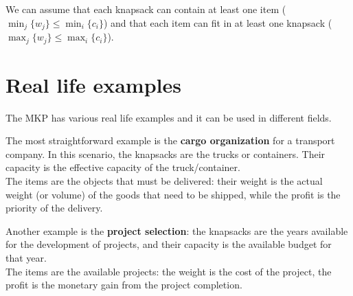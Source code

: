 We can assume that each knapsack can contain at least one item (\(\min_{j}\{w_{j}\} \leq \min_{i}\{c_{i}\}\))
and that each item can fit in at least one knapsack (\(\max_{j}\{w_{j}\} \leq \max_{i}\{c_{i}\}\)).

\section{Real life examples}
The MKP has various real life examples and it can be used in different fields.

The most straightforward example is the \textbf{cargo organization} for a transport company.
In this scenario, the knapsacks are the trucks or containers.
Their capacity is the effective capacity of the truck/container.\\
The items are the objects that must be delivered:
their weight is the actual weight (or volume) of the goods that need to be shipped, while the profit is the priority of the delivery.

Another example is the \textbf{project selection}: the knapsacks are
the years available for the development of projects,
and their capacity is the available budget for that year.\\
The items are the available projects: the weight is the cost of the project, the profit is the monetary gain
from the project completion.